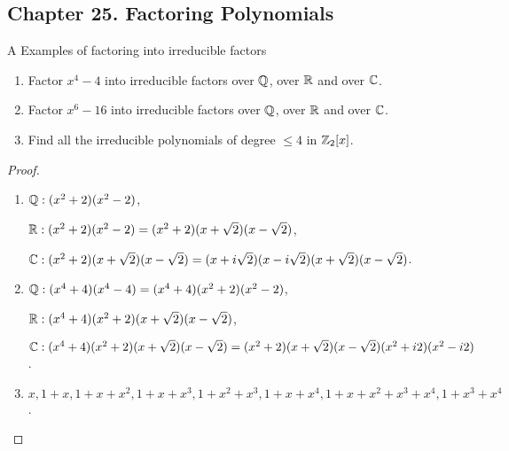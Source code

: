 \subsection*{Chapter 25. Factoring Polynomials}


\begin{exercise}{A Examples of factoring into irreducible factors}
\begin{enumerate}
    \item Factor $x^4-4$ into irreducible factors over $\mathbb{Q}$, over $\mathbb{R}$ and over $\mathbb{C}$.
    \item Factor $x^6-16$ into irreducible factors over $\mathbb{Q}$, over $\mathbb{R}$ and over $\mathbb{C}$.
    \item Find all the irreducible polynomials of degree $\leq 4$ in $\mathbb{Z}_2[x]$.
\end{enumerate}
\end{exercise}
\begin{proof}
 \begin{enumerate}
     \item $\mathbb{Q}: (x^2+2)(x^2-2)$,
     
     $\mathbb{R}: (x^2+2)(x^2-2)=(x^2+2)(x+\sqrt{2})(x-\sqrt{2})$, 
     
     $\mathbb{C}: (x^2+2)(x+\sqrt{2})(x-\sqrt{2})=(x+i\sqrt{2})(x-i\sqrt{2})(x+\sqrt{2})(x-\sqrt{2})$.
     \item $\mathbb{Q}: (x^4+4)(x^4-4)=(x^4+4)(x^2+2)(x^2-2)$,
     
     $\mathbb{R}: (x^4+4)(x^2+2)(x+\sqrt{2})(x-\sqrt{2})$,
     
     $\mathbb{C}:(x^4+4)(x^2+2)(x+\sqrt{2})(x-\sqrt{2})=(x^2+2)(x+\sqrt{2})(x-\sqrt{2})(x^2+i2)(x^2-i2)$.
     \item $x, 1+x, 1+x+x^2, 1+x+x^3, 1+x^2+x^3, 1+x+x^4, 1+x+x^2+x^3+x^4, 1+x^3+x^4$.
 \end{enumerate}
\end{proof}

